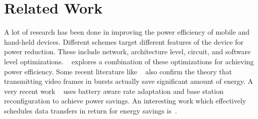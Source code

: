 \section{Related Work}
A lot of research has been done in improving the power efficiency of mobile and hand-held devices. Different schemes target different features of the device for power reduction. These include network, architecture level, circuit, and software level optimizations. ~\cite{mohapatra_mm03} explores a combination of these optimizations for achieving power efficiency. Some recent literature like ~\cite{mobiarch,movid} also confirm the theory that transmitting video frames in bursts actually save significant amount of energy. A very recent work ~\cite{ucsd_wcnc} uses battery aware rate adaptation and base station reconfiguration to achieve power savings. An interesting work which effectively schedules data transfers in return for energy savings is~\cite{balasubramanian_imc09}.